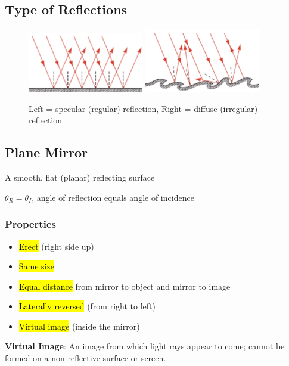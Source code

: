 \documentclass[a4paper,12pt]{article}
\begin{document}
\subsection{Type of Reflections}
\begin{figure}[H]
    \centering
    \includegraphics[width=0.45\textwidth]{specular-reflection}
    \includegraphics[width=0.45\textwidth]{diffuse-reflection}
    \caption{Left = specular (regular) reflection, Right = diffuse (irregular) reflection}
\end{figure}

\subsection{Plane Mirror}
A smooth, flat (planar) reflecting surface

$\theta_R = \theta_I$, angle of reflection equals angle of incidence

\subsubsection{Properties}
\begin{itemize}
    \item{\hl{Erect} (right side up)}
    \item{\hl{Same size}}
    \item{\hl{Equal distance} from mirror to object and mirror to image}
    \item{\hl{Laterally reversed} (from right to left)}
    \item{\hl{Virtual image} (inside the mirror)}
\end{itemize}

\textbf{Virtual Image}: An image from which light rays appear to come; cannot be formed on a non-reflective surface or screen.
\end{document}
